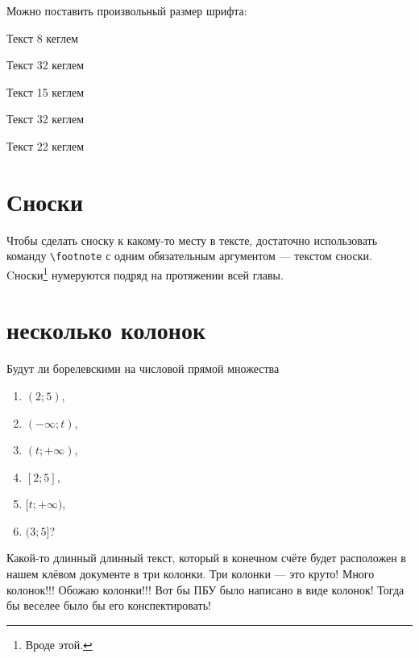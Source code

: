 \documentclass[12pt, a4paper]{article}
\begin{document}
\vspace{1cm}

Можно поставить произвольный размер шрифта:


{ \fontsize{8}{1.33}\selectfont Текст 8 кеглем}

{ \fontsize{32}{1.33}\selectfont Текст 32 кеглем}

{ \fontsize{15}{1.33}\selectfont Текст 15 кеглем}

\newcommand{\newsize}[1]
{{\fontsize{32}{1.33}\selectfont #1 }}

\newsize{ Текст 32 кеглем }

\newcommand{\mysize}[2]
{{\fontsize{#1}{1.33}\selectfont #2 }}

\mysize{22}{Текст 22 кеглем}


\section{Сноски}

Чтобы сделать сноску к какому-то месту в тексте, достаточно использовать команду \verb|\footnote| с одним обязательным аргументом — текстом сноски. Cноски\footnote{Вроде этой.} нумеруются подряд на протяжении всей главы.


\section{несколько колонок}

Будут ли борелевскими на числовой прямой множества
\begin{multicols}{2}
\begin{enumerate}
    \item $(2;5)$,
    \item $(-\infty;t)$,
    \item $(t; +\infty)$,
    \item $[2;5]$,
    \item $[t; +\infty)$,
    \item $(3;5]$?
\end{enumerate}
\end{multicols}

\begin{multicols}{3}
Какой-то длинный длинный текст, который в конечном счёте будет расположен  в нашем клёвом документе в три колонки. Три колонки --- это круто! Много колонок!!! Обожаю колонки!!! Вот бы ПБУ было написано в виде колонок! Тогда бы веселее было бы его конспектировать!
\end{multicols}
\end{document}

